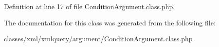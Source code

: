 Definition at line 17 of file Condition\+Argument.\+class.\+php.



The documentation for this class was generated from the following file\+:\begin{DoxyCompactItemize}
\item 
classes/xml/xmlquery/argument/\hyperlink{ConditionArgument_8class_8php}{Condition\+Argument.\+class.\+php}\end{DoxyCompactItemize}
